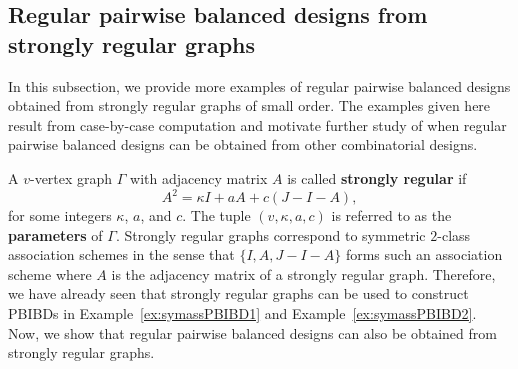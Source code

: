 \documentclass[11pt]{article}
\begin{document}
\subsection{Regular pairwise balanced designs from strongly regular graphs}

In this subsection, we provide more examples of regular pairwise balanced designs obtained from strongly regular graphs of small order.
The examples given here result from case-by-case computation and motivate further study of when regular pairwise balanced designs can be obtained from other combinatorial designs.

A $v$-vertex graph $\Gamma$ with adjacency matrix $A$ is called \textbf{strongly regular} if 
\[
A^2 = \kappa I + a A + c (J-I-A),
\]
for some integers $\kappa$, $a$, and $c$.
The tuple $(v,\kappa,a,c)$ is referred to as the \textbf{parameters} of $\Gamma$. 
Strongly regular graphs correspond to symmetric $2$-class association schemes in the sense that $\{I,A,J-I-A\}$ forms such an association scheme where $A$ is the adjacency matrix of a strongly regular graph.
Therefore, we have already seen that strongly regular graphs can be used to construct %
PBIBDs in Example~\ref{ex:symassPBIBD1} and Example~\ref{ex:symassPBIBD2}.
Now, we show that regular pairwise balanced designs can also be obtained from strongly regular graphs.
\end{document}
